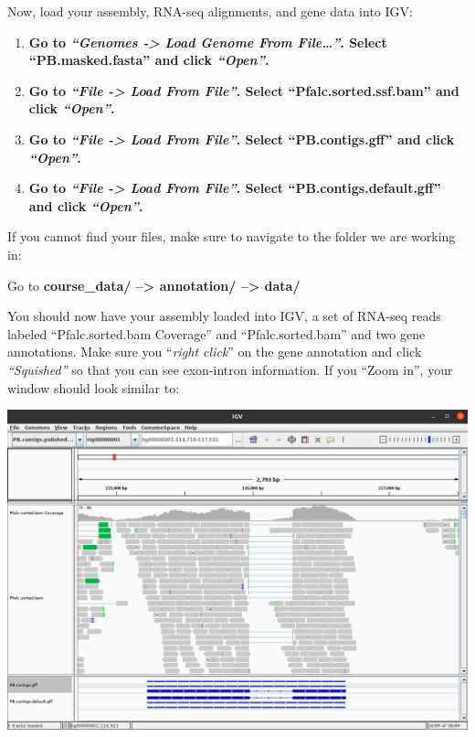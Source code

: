 \documentclass[11pt]{article}
\providecommand{\tightlist}{%
      \setlength{\itemsep}{0pt}\setlength{\parskip}{0pt}}
\begin{document}
Now, load your assembly, RNA-seq alignments, and gene data into IGV:

\begin{enumerate}
\def\labelenumi{\arabic{enumi}.}
\tightlist
\item
  \textbf{Go to \textit{``Genomes -\textgreater{} Load Genome From
  File\ldots{}''}. Select ``PB.masked.fasta'' and click
  \textit{``Open''}.}
\item
  \textbf{Go to \textit{``File -\textgreater{} Load From File''}. Select
  ``Pfalc.sorted.ssf.bam'' and click \textit{``Open''}.}
\item
  \textbf{Go to \textit{``File -\textgreater{} Load From File''}. Select
  ``PB.contigs.gff'' and click \textit{``Open''}.}
\item
  \textbf{Go to \textit{``File -\textgreater{} Load From File''}. Select
  ``PB.contigs.default.gff'' and click \textit{``Open''}.}
\end{enumerate}

If you cannot find your files, make sure to navigate to the folder we
are working in:

Go to \textbf{course\_data/ --\textgreater{} annotation/
--\textgreater{} data/}

You should now have your assembly loaded into IGV, a set of RNA-seq
reads labeled ``Pfalc.sorted.bam Coverage'' and ``Pfalc.sorted.bam'' and
two gene annotations. Make sure you ``\textit{right click}'' on the gene
annotation and click \textit{``Squished''} so that you can see exon-intron
information. If you ``Zoom in'', your window should look similar to:

\includegraphics{images/IGV_1.png}
\end{document}
